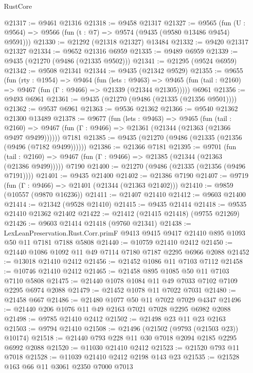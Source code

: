 \begin{lexlean}{RustCore}
\begin{coremodule}
@21317 := @9461 @21316
@21318 := @9458 @21317
@21327 := @9565
    (fun (U : @9564) => @9566 (fun (t : @7) => @9574 (@9435 (@9580 @13486 @9454) @9591)))
@21330 := @21292 (@21318 @21327) @13484
@21332 := @9420 @21317 @21327
@21334 := @9652 @21316 @6959
@21335 := @9489 @6959
@21339 := @9435 (@21270 (@9486 (@21335 @9502)))
@21341 := @21295 (@9524 @6959)
@21342 := @9508 @21341
@21344 := @9435 (@21342 @9529)
@21355 := @9655
    (fun (rty : @1954) =>
    @9464
      (fun (lets : @9463) =>
      @9465 (fun (tail : @2160) => @9467 (fun (Γ : @9466) => @21339 (@21344 @21305)))))
    @6961
@21356 := @9493 @6961
@21361 := @9435 (@21270 (@9486 (@21335 (@21356 @9501))))
@21362 := @9537 @6961
@21363 := @9536 @21362
@21366 := @9540 @21362 @21300 @13489
@21378 := @9677
    (fun (lets : @9463) =>
    @9465
      (fun (tail : @2160) =>
      @9467 (fun (Γ : @9466) => @21361 (@21344 (@21363 (@21366 @9497 @9499))))))
    @7181
@21385 := @9435 (@21270 (@9486 (@21335 (@21356 (@9496 (@7182 @9499))))))
@21386 := @21366 @7181
@21395 := @9701
    (fun (tail : @2160) => @9467 (fun (Γ : @9466) => @21385 (@21344 (@21363 (@21386 @9499)))))
    @7190
@21400 := @21270 (@9486 (@21335 (@21356 (@9496 @7191))))
@21401 := @9435 @21400
@21402 := @21386 @7190
@21407 := @9719 (fun (Γ : @9466) => @21401 (@21344 (@21363 @21402)))
@21410 := @9859 (@10557 (@9870 @16236))
@21411 := @21407 @21410
@21412 := @9603 @21400
@21414 := @21342 (@9528 @21410)
@21415 := @9435 @21414
@21418 := @9535 @21410 @21362 @21402
@21422 := @21412 (@21415 @21418) (@9755 @21269)
@21426 := @9603 @21414 @21418 (@9760 @21341)
@21438 := LexLeanPreservation.Rust.Corr.primF
    @9413
    @9415
    @9417
    @21410
    @895
    @1093
    @50
    @11
    @7181
    @7188
    @5808
@21440 := @10759 @21410 @2412
@21450 := @21440 @1086 @1092 @11 @49 @7114 @7180 @7187 @2295 @6966 @2088
@21452 := @13018 @21410 @2412
@21456 := @21452 @1086 @11 @7103 @7112
@21458 := @10746 @21410 @2412
@21465 := @21458 @895 @1085 @50 @11 @7103 @7110 @5808
@21475 := @21440 @1078 @1084 @11 @49 @7033 @7102 @7109 @2295 @6974 @2088
@21479 := @21452 @1078 @11 @7022 @7031
@21480 := @21458 @667
@21486 := @21480 @1077 @50 @11 @7022 @7029 @4347
@21496 := @21440 @206 @1076 @11 @49 @2163 @7021 @7028 @2295 @6982 @2088
@21498 := @9785 @21410 @2412
@21502 := @21498 @23 @11 @23 @2163
@21503 := @9794 @21410
@21508 := @21496 (@21502 (@9793 (@21503 @23)) @10174)
@21518 := @21440 @793 @228 @11 @30 @7018 @2094 @2185 @2295 @6992 @2088
@21520 := @11030 @21410 @2412
@21523 := @21520 @793 @11 @7018
@21528 := @11039 @21410 @2412 @2198 @143 @23
@21535 := @21528 @163 @66 @11 @3061 @2350 @7000 @7013

\end{coremodule}
\end{lexlean}
